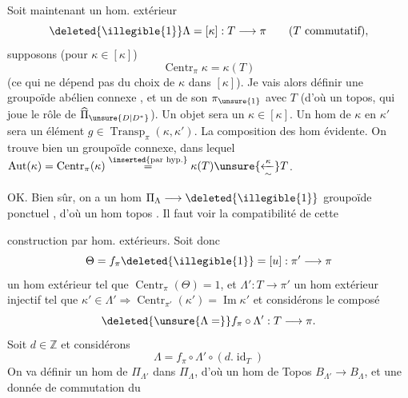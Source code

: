 Soit maintenant un hom. extérieur 
\[
\deleted{\illegible{1}}\Lambda=[\kappa]:T\longrightarrow\pi
\qquad (T\text{ commutatif}),
\]
supposons (pour \(\kappa\in[\kappa]\))
\[
\operatorname{Centr}_\pi\kappa=\kappa(T)
\]
(ce qui ne dépend pas du choix de \(\kappa\) dans
\([\kappa]\)). Je vais alors définir une
 groupoïde abélien connexe \inserted{\(\Pi_\Lambda\)}, et un
 de son \(\pi_{\unsure{1}}\) avec \(T\) 
(d'où un topos, qui joue le rôle de
\(\widehat{\Pi}_{\unsure{D|D^*}}\)). Un objet sera un \(\kappa\in[\kappa]\).
Un hom de \(\kappa\) en \(\kappa'\) sera un
élément \(g\in\operatorname{Transp}_\pi(\kappa,\kappa')\). 
La composition des hom évidente. On
trouve bien un groupoïde connexe, dans
lequel \(\operatorname{Aut}(\kappa)=\operatorname{Centr}_\pi(\kappa)\overset{\inserted{\text{par hyp.}}}{=}\kappa(T)\unsure{\xleftarrow[\sim]{\kappa}}T\).

OK. Bien sûr, on a un hom
\(\Pi_\Lambda\longrightarrow\deleted{\illegible{1}}\) groupoïde ponctuel , d'où
un hom topos  .
Il faut voir la compatibilité de cette

construction par hom. extérieurs. Soit donc
\[
\Theta=f_\pi\deleted{\illegible{1}}=[u]:\pi'\longrightarrow\pi
\]
un hom extérieur tel que \(\operatorname{Centr}_\pi(\Theta)=1\),
et \(\Lambda':T\longrightarrow\pi'\) un hom extérieur injectif
tel que \(\kappa'\in\Lambda'\Rightarrow\operatorname{Centr}_{\pi'}(\kappa')=\operatorname{Im}\kappa'\)
et considérons le composé
\[
\deleted{\unsure{\Lambda=}}f_\pi\circ\Lambda':T\longrightarrow\pi.
\]
Soit \(d\in\mathbb Z\) et considérons
\[
\Lambda=f_\pi\circ\Lambda'\circ(d.\operatorname{id}_T)
\]
On va définir un hom de \(\Pi_{\Lambda'}\) dans \(\Pi_\Lambda\),
d'où un hom de Topos \(B_{\Lambda'}\longrightarrow B_\Lambda\),
et une donnée de commutation \inserted{\(\alpha\)} du

